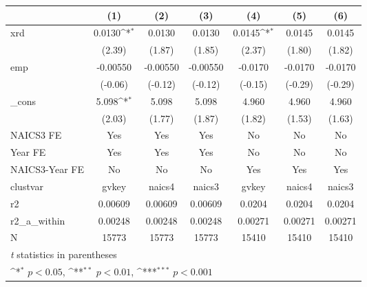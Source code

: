 {
\def\sym#1{\ifmmode^{#1}\else\(^{#1}\)\fi}
\begin{tabular}{l*{6}{c}}
\hline\hline
            &\multicolumn{1}{c}{(1)}         &\multicolumn{1}{c}{(2)}         &\multicolumn{1}{c}{(3)}         &\multicolumn{1}{c}{(4)}         &\multicolumn{1}{c}{(5)}         &\multicolumn{1}{c}{(6)}         \\
\hline
xrd         &      0.0130\sym{*}  &      0.0130         &      0.0130         &      0.0145\sym{*}  &      0.0145         &      0.0145         \\
            &      (2.39)         &      (1.87)         &      (1.85)         &      (2.37)         &      (1.80)         &      (1.82)         \\
[1em]
emp         &    -0.00550         &    -0.00550         &    -0.00550         &     -0.0170         &     -0.0170         &     -0.0170         \\
            &     (-0.06)         &     (-0.12)         &     (-0.12)         &     (-0.15)         &     (-0.29)         &     (-0.29)         \\
[1em]
\_cons      &       5.098\sym{*}  &       5.098         &       5.098         &       4.960         &       4.960         &       4.960         \\
            &      (2.03)         &      (1.77)         &      (1.87)         &      (1.82)         &      (1.53)         &      (1.63)         \\
[1em]
NAICS3 FE   &         Yes         &         Yes         &         Yes         &          No         &          No         &          No         \\
[1em]
Year FE     &         Yes         &         Yes         &         Yes         &          No         &          No         &          No         \\
[1em]
NAICS3-Year FE&          No         &          No         &          No         &         Yes         &         Yes         &         Yes         \\
\hline
clustvar    &       gvkey         &      naics4         &      naics3         &       gvkey         &      naics4         &      naics3         \\
r2          &     0.00609         &     0.00609         &     0.00609         &      0.0204         &      0.0204         &      0.0204         \\
r2\_a\_within &     0.00248         &     0.00248         &     0.00248         &     0.00271         &     0.00271         &     0.00271         \\
N           &       15773         &       15773         &       15773         &       15410         &       15410         &       15410         \\
\hline\hline
\multicolumn{7}{l}{\footnotesize \textit{t} statistics in parentheses}\\
\multicolumn{7}{l}{\footnotesize \sym{*} \(p<0.05\), \sym{**} \(p<0.01\), \sym{***} \(p<0.001\)}\\
\end{tabular}
}
